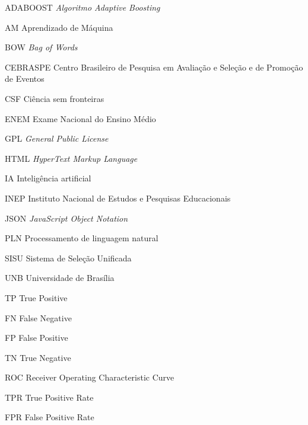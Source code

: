 \begin{basedescript}{\desclabelstyle{\pushlabel}\desclabelwidth{6em}}
\item[{ADABOOST} \textit{Algoritmo Adaptive Boosting}]%
\item[{AM}] Aprendizado de Máquina %
\item[{BOW}] \textit{Bag of Words}%
\item[{CEBRASPE}] Centro Brasileiro de Pesquisa em Avaliação e Seleção e de Promoção de Eventos%
\item[{CSF}] Ciência sem fronteiras%
\item[{ENEM}] Exame Nacional do Ensino Médio%
\item[{GPL}] \textit{General Public License} %
\item[{HTML}] \textit{HyperText Markup Language}%
\item[{IA}] Inteligência artificial%
\item[{INEP}] Instituto Nacional de Estudos e Pesquisas Educacionais%
\item[{JSON}] \textit{JavaScript Object Notation}%
\item[{PLN}] Processamento de linguagem natural%
\item[{SISU}] Sistema de Seleção Unificada%
\item[{UNB}] Universidade de Brasília%
\item[{TP}] True Positive%
\item[{FN}] False Negative%
\item[{FP}] False Positive%
\item[{TN}] True Negative%
\item[{ROC}] Receiver Operating Characteristic Curve%
\item[{TPR}] True Positive Rate%
\item[{FPR}] False Positive Rate%
\end{basedescript}